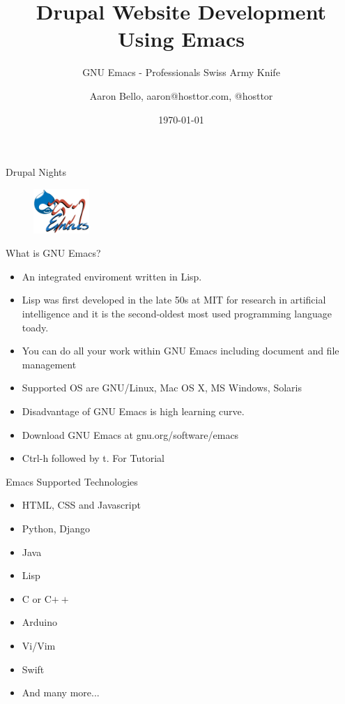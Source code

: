 \documentclass[english,12pt,presentation]{beamer}
\title{Drupal Website Development Using Emacs}
\subtitle{GNU Emacs - Professionals Swiss Army Knife}
\author{Aaron Bello, aaron@hosttor.com, @hosttor}
\date{\today}
\begin{document}
\begin{frame}{Drupal Nights}
\begin{figure}
\centering
\includegraphics[width=80]{images/logo.png}
\end{figure}
\titlepage
\end{frame}

\begin{frame}{What is GNU Emacs?}
\begin{itemize}
\pause \item An integrated enviroment written in Lisp. 
\pause \item Lisp was first developed in the late 50s at MIT for research in artificial intelligence and it is the second-oldest most used programming language toady. 
\pause \item You can do all your work within GNU Emacs including document and file management
\pause \item Supported OS are GNU/Linux, Mac OS X, MS Windows, Solaris
\pause \item Disadvantage of GNU Emacs is high learning curve.
\pause \item Download GNU Emacs at gnu.org/software/emacs
\pause \item Ctrl-h followed by t. For Tutorial
\end{itemize}
\end{frame}

\begin{frame}{Emacs Supported Technologies}
\begin{itemize}
\pause \item HTML, CSS and Javascript
\pause \item Python, Django
\pause \item Java
\pause \item Lisp
\pause \item C or C$++$
\pause \item Arduino
\pause \item Vi/Vim
\pause \item Swift
\pause \item And many more...
\end{itemize}
\end{frame}
\end{document}
